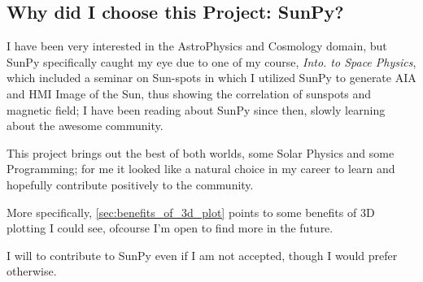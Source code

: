 \subsection{Why did I choose this Project: SunPy?}
    I have been very interested in the AstroPhysics and Cosmology domain, but SunPy specifically caught my eye due to one of my course, \textit{Into. to Space Physics}, which included a seminar on Sun-spots in which I utilized SunPy to generate AIA and HMI Image of the Sun, thus showing the correlation of sunspots and magnetic field;
    I have been reading about SunPy since then, slowly learning about the awesome community.

    This project brings out the best of both worlds, some Solar Physics and some Programming; for me it looked like a natural choice in my career to learn and hopefully contribute positively to the community.

    More specifically, \autoref{sec:benefits_of_3d_plot} points to some benefits of 3D plotting I could see, ofcourse I'm open to find more in the future.

    I will to contribute to SunPy even if I am not accepted, though I would prefer otherwise.


